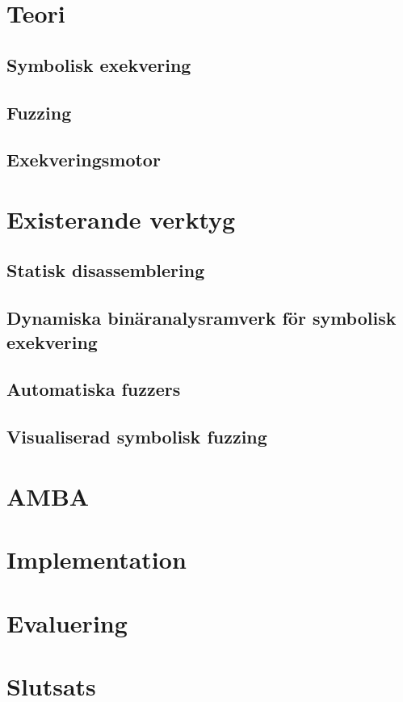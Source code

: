 \documentclass[12pt,a4paper,twoside,openright]{report}
\begin{document}
\chapter{Teori}\label{chap:teori}

\section{Symbolisk exekvering}\label{sec:symbolic_execution}

\section{Fuzzing}

\section{Exekveringsmotor}


\chapter{Existerande verktyg}\label{chap:existerande_verktyg}

\section{Statisk disassemblering}\label{sec:existerande-disasm}

\section{Dynamiska binäranalysramverk för symbolisk exekvering}\label{sec:existerande-ramverk}

\section{Automatiska fuzzers}\label{sec:existerande-automatisk}

\section{Visualiserad symbolisk fuzzing}\label{sec:existerande-visualiserad}


\chapter{AMBA}\label{chap:amba}


\chapter{Implementation}\label{chap:implementation}


\chapter{Evaluering}\label{chap:evaluering}


\chapter{Slutsats}\label{chap:slutsats}


\printbibliography{}
\end{document}
